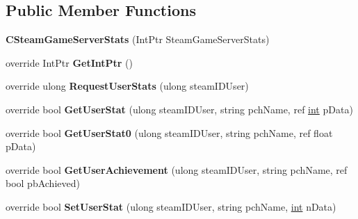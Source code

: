 \subsection*{Public Member Functions}
\begin{DoxyCompactItemize}
\item 
\hypertarget{classValve_1_1Steamworks_1_1CSteamGameServerStats_aad5ac1457963d0e184cab80ad55b4273}{}{\bfseries C\+Steam\+Game\+Server\+Stats} (Int\+Ptr Steam\+Game\+Server\+Stats)\label{classValve_1_1Steamworks_1_1CSteamGameServerStats_aad5ac1457963d0e184cab80ad55b4273}

\item 
\hypertarget{classValve_1_1Steamworks_1_1CSteamGameServerStats_a453c1afef643d8914f41c4e86603a1f2}{}override Int\+Ptr {\bfseries Get\+Int\+Ptr} ()\label{classValve_1_1Steamworks_1_1CSteamGameServerStats_a453c1afef643d8914f41c4e86603a1f2}

\item 
\hypertarget{classValve_1_1Steamworks_1_1CSteamGameServerStats_af71a39cd95e5dc12170e61698192a9cd}{}override ulong {\bfseries Request\+User\+Stats} (ulong steam\+I\+D\+User)\label{classValve_1_1Steamworks_1_1CSteamGameServerStats_af71a39cd95e5dc12170e61698192a9cd}

\item 
\hypertarget{classValve_1_1Steamworks_1_1CSteamGameServerStats_a94233f56bfd2d841e67f54def4ac93ec}{}override bool {\bfseries Get\+User\+Stat} (ulong steam\+I\+D\+User, string pch\+Name, ref \hyperlink{SDL__thread_8h_a6a64f9be4433e4de6e2f2f548cf3c08e}{int} p\+Data)\label{classValve_1_1Steamworks_1_1CSteamGameServerStats_a94233f56bfd2d841e67f54def4ac93ec}

\item 
\hypertarget{classValve_1_1Steamworks_1_1CSteamGameServerStats_a517475fc719ffdac567ec178280e693e}{}override bool {\bfseries Get\+User\+Stat0} (ulong steam\+I\+D\+User, string pch\+Name, ref float p\+Data)\label{classValve_1_1Steamworks_1_1CSteamGameServerStats_a517475fc719ffdac567ec178280e693e}

\item 
\hypertarget{classValve_1_1Steamworks_1_1CSteamGameServerStats_a653fc79c9a639912efb0b320e77005f4}{}override bool {\bfseries Get\+User\+Achievement} (ulong steam\+I\+D\+User, string pch\+Name, ref bool pb\+Achieved)\label{classValve_1_1Steamworks_1_1CSteamGameServerStats_a653fc79c9a639912efb0b320e77005f4}

\item 
\hypertarget{classValve_1_1Steamworks_1_1CSteamGameServerStats_a09249b441e9bb48acb290f1c858a0a19}{}override bool {\bfseries Set\+User\+Stat} (ulong steam\+I\+D\+User, string pch\+Name, \hyperlink{SDL__thread_8h_a6a64f9be4433e4de6e2f2f548cf3c08e}{int} n\+Data)\label{classValve_1_1Steamworks_1_1CSteamGameServerStats_a09249b441e9bb48acb290f1c858a0a19}


\end{DoxyCompactItemize}
